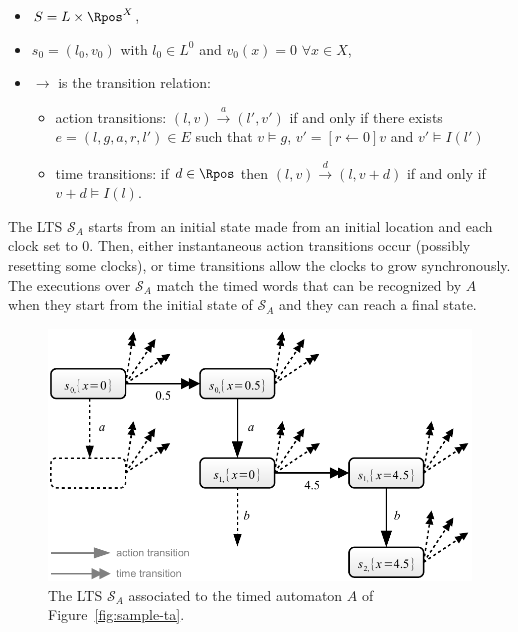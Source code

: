 \begin{itemize}

    \item $S = L \times \Rpos^X$,

    \item $s_0 = (l_0, v_0)$ with $l_0 \in L^0$ and $v_0(x) = 0$ $\forall x \in X$,

    \item $\rightarrow$ is the transition relation:
    \begin{itemize}

        \item action transitions: $(l, v) \stackrel{a}{\longrightarrow} (l', v')$ if and only if there exists
        $e = (l, g, a, r, l') \in E$ such that $v \models g$, $v' = [r \leftarrow 0]v$ and $v' \models I(l')$

        \item time transitions: if $d \in \Rpos$ then $(l, v) \stackrel{d}{\longrightarrow} (l, v + d)$ if and only if $v + d \models I(l)$.

    \end{itemize}

\end{itemize}

The LTS $\mathcal{S}_A$ starts from an initial state made from an initial location and each clock set to $0$. Then, either instantaneous action transitions occur (possibly resetting some clocks), or time transitions allow the clocks to grow synchronously. The executions over $\mathcal{S}_A$ match the timed words that can be recognized by $A$ when they start from the initial state of $\mathcal{S}_A$ and they can reach a final state.\\

\begin{figure}[htbp]
    \centering
    \includegraphics[width=\textwidth]{content/timed-automata/semantic-lts}
    \caption{The LTS $\mathcal{S}_A$ associated to the timed automaton $A$ of Figure~\ref{fig:sample-ta}.}
    \label{fig:semantic-lts}
\end{figure}

